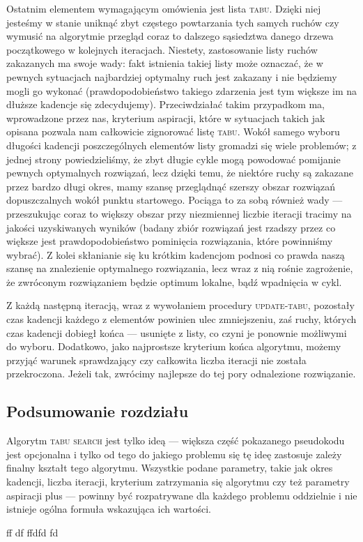 Ostatnim elementem wymagającym omówienia jest lista \textsc{tabu}. Dzięki niej jesteśmy w stanie uniknąć zbyt częstego powtarzania tych samych ruchów czy wymusić na algorytmie przegląd coraz to dalszego sąsiedztwa danego drzewa początkowego w kolejnych iteracjach. Niestety, zastosowanie listy ruchów zakazanych ma swoje wady: fakt istnienia takiej listy może oznaczać, że w pewnych sytuacjach najbardziej optymalny ruch jest zakazany i nie będziemy mogli go wykonać (prawdopodobieństwo takiego zdarzenia jest tym większe im na dłuższe kadencje się zdecydujemy). Przeciwdziałać takim przypadkom ma, wprowadzone przez nas, kryterium aspiracji, które w sytuacjach takich jak opisana pozwala nam całkowicie zignorować listę \textsc{tabu}. Wokół samego wyboru długości kadencji poszczególnych elementów listy gromadzi się wiele problemów; z jednej strony powiedzieliśmy, że zbyt długie cykle mogą powodować pomijanie pewnych optymalnych rozwiązań, lecz dzięki temu, że niektóre ruchy są zakazane przez bardzo długi okres, mamy szansę przeglądnąć szerszy obszar rozwiązań dopuszczalnych wokół punktu startowego. Pociąga to za sobą również wady --- przeszukując coraz to większy obszar przy niezmiennej liczbie iteracji tracimy na jakości uzyskiwanych wyników (badany zbiór rozwiązań jest rzadszy przez co większe jest prawdopodobieństwo pominięcia rozwiązania, które powinniśmy wybrać). Z kolei skłanianie się ku krótkim kadencjom podnosi co prawda naszą szansę na znalezienie optymalnego rozwiązania, lecz wraz z nią rośnie zagrożenie, że zwróconym rozwiązaniem będzie optimum lokalne, bądź wpadnięcia w cykl.

Z każdą następną iteracją, wraz z wywołaniem procedury \textsc{update-tabu}, pozostały czas kadencji każdego z elementów powinien ulec zmniejszeniu, zaś ruchy, których czas kadencji dobiegł końca --- usunięte z listy, co czyni je ponownie możliwymi do wyboru. Dodatkowo, jako najprostsze kryterium końca algorytmu, możemy przyjąć warunek sprawdzający czy całkowita liczba iteracji nie została przekroczona. Jeżeli tak, zwrócimy najlepsze do tej pory odnalezione rozwiązanie.

\subsection{Podsumowanie rozdziału}

Algorytm \textsc{tabu search} jest tylko ideą --- większa część pokazanego pseudokodu jest opcjonalna i tylko od tego do jakiego problemu się tę ideę zastosuje zależy finalny kształt tego algorytmu. Wszystkie podane parametry, takie jak okres kadencji, liczba iteracji, kryterium zatrzymania się algorytmu czy też parametry aspiracji plus --- powinny być rozpatrywane dla każdego problemu oddzielnie i nie istnieje ogólna formuła wskazująca ich wartości.

ff
df
ffdfd
fd